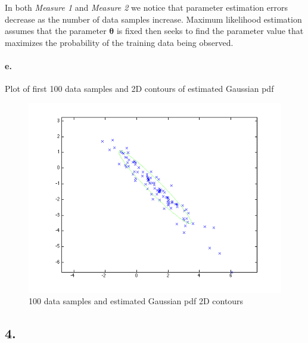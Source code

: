 \documentclass[a4paper]{article}
\begin{document}
In both \emph{Measure 1} and \emph{Measure 2} we notice that parameter estimation errors decrease as the number of data samples increase. Maximum likelihood estimation assumes that the parameter $\boldsymbol{\theta}$ is fixed then seeks to find the parameter value that maximizes the probability of the training data being observed.

\paragraph{e.} Plot of first 100 data samples and 2D contours of estimated Gaussian pdf \\
\begin{figure}[H]
  \centering
    \includegraphics[scale=.47]{images/3_f_II.png}
  \caption{100 data samples and estimated Gaussian pdf 2D contours}
\end{figure}

\subsection*{4.}

\end{document}
